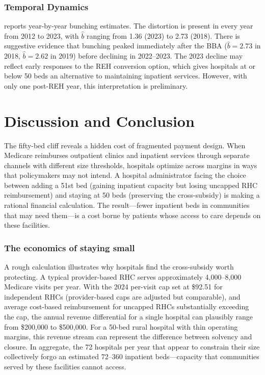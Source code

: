 \documentclass[12pt]{article}
\begin{document}
\subsubsection*{Temporal Dynamics}  reports year-by-year bunching estimates. The distortion is present in every year from 2012 to 2023, with $\hat{b}$ ranging from 1.36 (2023) to 2.73 (2018). There is suggestive evidence that bunching peaked immediately after the BBA ($\hat{b} = 2.73$ in 2018, $\hat{b} = 2.62$ in 2019) before declining in 2022--2023. The 2023 decline may reflect early responses to the REH conversion option, which gives hospitals at or below 50 beds an alternative to maintaining inpatient services. However, with only one post-REH year, this interpretation is preliminary.



\section{Discussion and Conclusion}\label{sec:conclusion}

The fifty-bed cliff reveals a hidden cost of fragmented payment design. When Medicare reimburses outpatient clinics and inpatient services through separate channels with different size thresholds, hospitals optimize across margins in ways that policymakers may not intend. A hospital administrator facing the choice between adding a 51st bed (gaining inpatient capacity but losing uncapped RHC reimbursement) and staying at 50 beds (preserving the cross-subsidy) is making a rational financial calculation. The result---fewer inpatient beds in communities that may need them---is a cost borne by patients whose access to care depends on these facilities.

\subsubsection*{The economics of staying small} A rough calculation illustrates why hospitals find the cross-subsidy worth protecting. A typical provider-based RHC serves approximately 4,000--8,000 Medicare visits per year. With the 2024 per-visit cap set at \$92.51 for independent RHCs (provider-based caps are adjusted but comparable), and average cost-based reimbursement for uncapped RHCs substantially exceeding the cap, the annual revenue differential for a single hospital can plausibly range from \$200,000 to \$500,000. For a 50-bed rural hospital with thin operating margins, this revenue stream can represent the difference between solvency and closure. In aggregate, the 72 hospitals per year that appear to constrain their size collectively forgo an estimated 72--360 inpatient beds---capacity that communities served by these facilities cannot access.
\end{document}
